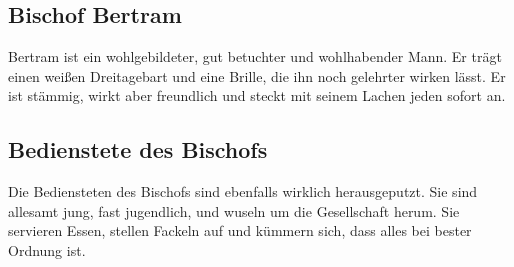 \subsection{Bischof Bertram}

Bertram ist ein wohlgebildeter, gut betuchter und wohlhabender Mann. Er trägt einen weißen Dreitagebart und eine Brille, die ihn noch gelehrter wirken lässt. Er ist stämmig, wirkt aber freundlich und steckt mit seinem Lachen jeden sofort an.

\subsection{Bedienstete des Bischofs}

Die Bediensteten des Bischofs sind ebenfalls wirklich herausgeputzt. Sie sind allesamt jung, fast jugendlich, und wuseln um die Gesellschaft herum. Sie servieren Essen, stellen Fackeln auf und kümmern sich, dass alles bei bester Ordnung ist.
